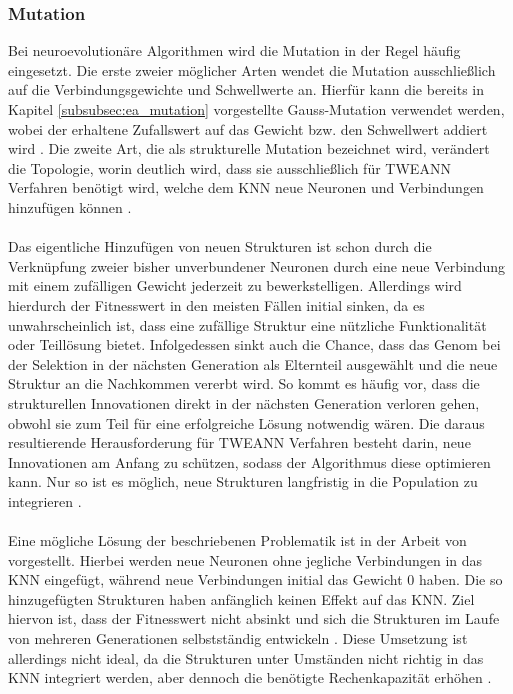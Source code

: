 \subsubsection{Mutation}
\label{subsubsec:mutation}
Bei neuroevolutionäre Algorithmen wird die Mutation in der Regel häufig eingesetzt. Die erste zweier möglicher Arten wendet die Mutation ausschließlich auf die Verbindungsgewichte und Schwellwerte an. Hierfür kann die bereits in Kapitel \ref{subsubsec:ea_mutation} vorgestellte Gauss-Mutation verwendet werden, wobei der erhaltene Zufallswert auf das Gewicht bzw. den Schwellwert addiert wird \cite{mcintyre_neatpython}. Die zweite Art, die als strukturelle Mutation bezeichnet wird, verändert die Topologie, worin deutlich wird, dass sie ausschließlich für \ac{TWEANN} Verfahren benötigt wird, welche dem \ac{KNN} neue Neuronen und Verbindungen hinzufügen können \cite{stanley2002evolving}.
\\\\
Das eigentliche Hinzufügen von neuen Strukturen ist schon durch die Verknüpfung zweier bisher unverbundener Neuronen durch eine neue Verbindung mit einem zufälligen Gewicht jederzeit zu bewerkstelligen. Allerdings wird hierdurch der Fitnesswert in den meisten Fällen initial sinken, da es unwahrscheinlich ist, dass eine zufällige Struktur eine nützliche Funktionalität oder Teillösung bietet. Infolgedessen sinkt auch die Chance, dass das Genom bei der Selektion in der nächsten Generation als Elternteil ausgewählt und die neue Struktur an die Nachkommen vererbt wird. So kommt es häufig vor, dass die strukturellen Innovationen direkt in der nächsten Generation verloren gehen, obwohl sie zum Teil für eine erfolgreiche Lösung notwendig wären. Die daraus resultierende Herausforderung für \ac{TWEANN} Verfahren besteht darin, neue Innovationen am Anfang zu schützen, sodass der Algorithmus diese optimieren kann. Nur so ist es möglich, neue Strukturen langfristig in die Population zu integrieren \cite{stanley2002evolving}.
\\\\
Eine mögliche Lösung der beschriebenen Problematik ist in der Arbeit von \citeauthor{angeline1994gnarl} vorgestellt. Hierbei werden neue Neuronen ohne jegliche Verbindungen in das \ac{KNN} eingefügt, während neue Verbindungen initial das Gewicht $0$ haben. Die so hinzugefügten Strukturen haben anfänglich keinen Effekt auf das \ac{KNN}. Ziel hiervon ist, dass der Fitnesswert nicht absinkt und sich die Strukturen im Laufe von mehreren Generationen selbstständig entwickeln \cite{angeline1994gnarl}. Diese Umsetzung ist allerdings nicht ideal, da die Strukturen unter Umständen nicht richtig in das \ac{KNN} integriert werden, aber dennoch die benötigte Rechenkapazität erhöhen \cite{stanley2002evolving}.
